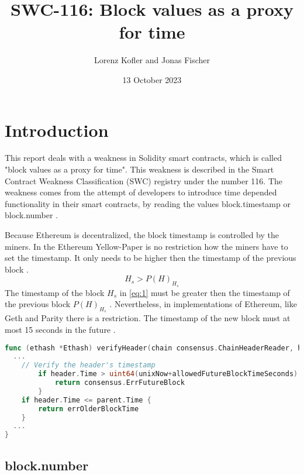 \documentclass{article}
\title{SWC-116: Block values as a proxy for time}
\author{Lorenz Kofler and Jonas Fischer}
\date{13 October 2023}
\begin{document}
\maketitle
\tableofcontents
\newpage

\section{Introduction}
This report deals with a weakness in Solidity smart contracts, which is called
"block values as a proxy for time". This weakness is described in the Smart
Contract Weakness Classification (SWC) registry under the number 116. \newline
The weakness comes from the attempt of developers to introduce time depended
functionality in their smart contracts, by reading the values block.timestamp
or block.number \cite{swc116}. \newline


Because Ethereum is decentralized, the block timestamp is controlled by the
miners. In the Ethereum Yellow-Paper is no restriction how the miners have to set the timestamp. It
only needs to be higher then the timestamp of the previous block \cite{Conkas2021}.
\begin{equation} \label{eq:2}
H_s > P(H)_{H_s}
\end{equation}
The timestamp of the block $H_s$ in \ref{eq:1} must be greater then the timestamp of the previous block $P(H)_{H_s}$ \cite{ethyellowpaper2023}.
Nevertheless, in implementations of Ethereum, like Geth and Parity there is a restriction. The timestamp of the new block
must at most 15 seconds in the future \cite{Conkas2021}. \newline

\begin{lstlisting}[language=go, caption="The restriction for the timestamp in Geth. Source: consensus/ethash/consensus.go \cite{timestamp_code}"]
func (ethash *Ethash) verifyHeader(chain consensus.ChainHeaderReader, header, parent *types.Header, uncle bool, unixNow int64) error {
  ...
	// Verify the header's timestamp
		if header.Time > uint64(unixNow+allowedFutureBlockTimeSeconds) {
			return consensus.ErrFutureBlock
		}
	if header.Time <= parent.Time {
		return errOlderBlockTime
	}
  ...
}
\end{lstlisting}

\subsection{block.number}


\end{document}
